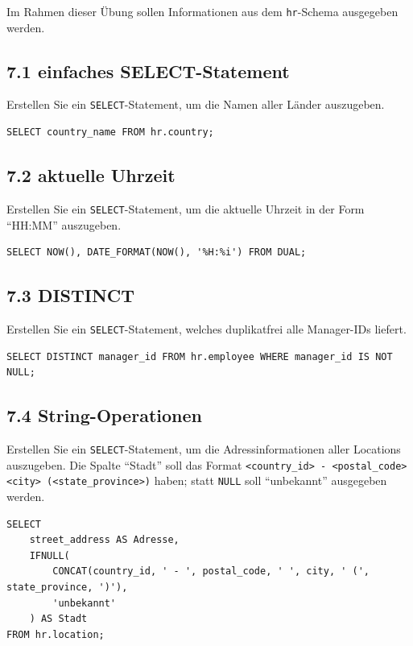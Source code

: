 \documentclass[11pt,a4paper]{article}
\begin{document}
Im Rahmen dieser \"Ubung sollen Informationen aus dem \texttt{hr}-Schema ausgegeben werden.

\subsection*{7.1 \quad einfaches SELECT-Statement}
Erstellen Sie ein \texttt{SELECT}-Statement, um die Namen aller L\"ander auszugeben.
\begin{loesung}
\begin{lstlisting}
SELECT country_name FROM hr.country;
\end{lstlisting}
\end{loesung}

\subsection*{7.2 \quad aktuelle Uhrzeit}
Erstellen Sie ein \texttt{SELECT}-Statement, um die aktuelle Uhrzeit in der Form ``HH:MM'' auszugeben.
\begin{loesung}
\begin{lstlisting}
SELECT NOW(), DATE_FORMAT(NOW(), '%H:%i') FROM DUAL;
\end{lstlisting}
\end{loesung}

\subsection*{7.3 \quad DISTINCT}
Erstellen Sie ein \texttt{SELECT}-Statement, welches duplikatfrei alle Manager-IDs liefert.
\begin{loesung}
\begin{lstlisting}
SELECT DISTINCT manager_id FROM hr.employee WHERE manager_id IS NOT NULL;
\end{lstlisting}
\end{loesung}

\subsection*{7.4 \quad String-Operationen}
Erstellen Sie ein \texttt{SELECT}-Statement, um die Adressinformationen aller Locations auszugeben. Die Spalte ``Stadt'' soll das Format \texttt{<country\_id> - <postal\_code> <city> (<state\_province>)} haben; statt \texttt{NULL} soll ``unbekannt'' ausgegeben werden.
\begin{loesung}
\begin{lstlisting}
SELECT
    street_address AS Adresse,
    IFNULL(
        CONCAT(country_id, ' - ', postal_code, ' ', city, ' (', state_province, ')'),
        'unbekannt'
    ) AS Stadt
FROM hr.location;
\end{lstlisting}
\end{loesung}
\end{document}
